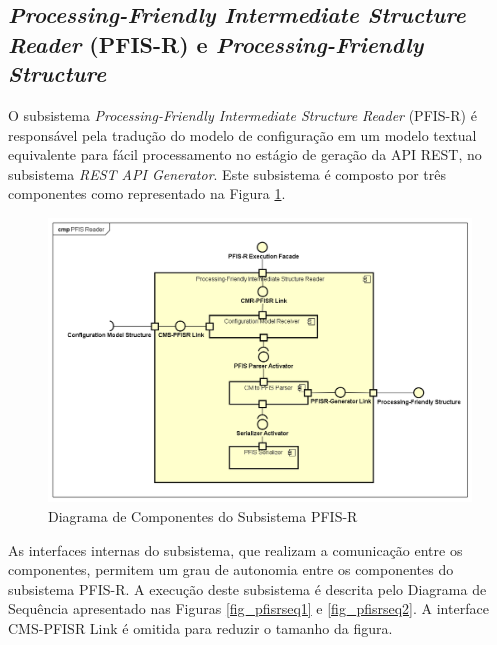 
\subsection{\textit{Processing-Friendly Intermediate Structure Reader} (PFIS-R) e \textit{Processing-Friendly Structure}}

O subsistema \textit{Processing-Friendly Intermediate Structure Reader} (PFIS-R) é responsável pela tradução do modelo de configuração em um modelo textual equivalente para fácil processamento no estágio de geração da API REST, no subsistema \textit{REST API Generator}. Este subsistema é composto por três componentes como representado na Figura \ref{fig_pfisrcom}.

\begin{figure}[htb]
    \begin{center}
        \includegraphics[scale=0.52]{imagens/PFIS_Reader_Subcomponent_Diagram.png}
    \end{center}
	\caption{\label{fig_pfisrcom}Diagrama de Componentes do Subsistema PFIS-R}
\end{figure}

As interfaces internas do subsistema, que realizam a comunicação entre os componentes, permitem um grau de autonomia entre os componentes do subsistema PFIS-R. A execução deste subsistema é descrita pelo Diagrama de Sequência apresentado nas Figuras \ref{fig_pfisrseq1} e \ref{fig_pfisrseq2}. A interface CMS-PFISR Link é omitida para reduzir o tamanho da figura.

